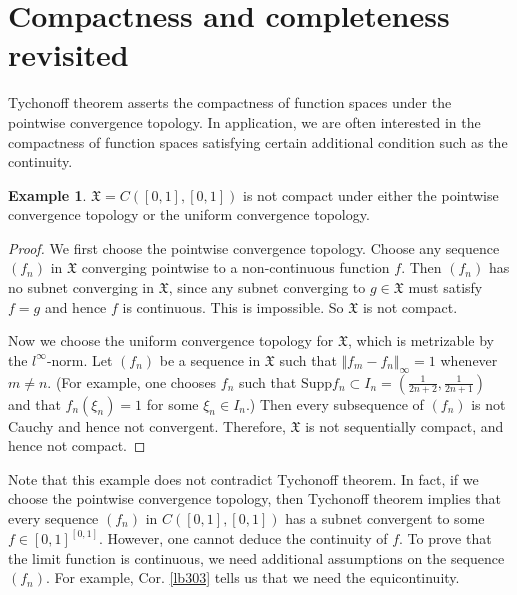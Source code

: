 \documentclass[12pt,b5paper,notitlepage]{article}
\theoremstyle{definition}
\newtheorem{eg}[df]{Example}
\theoremstyle{plain}
\newcommand{\fk}{\mathfrak}
\newcommand{\Supp}{\mathrm{Supp}}
\numberwithin{equation}{section}
\begin{document}
\newpage




\section{Compactness and completeness revisited}





Tychonoff theorem asserts the compactness of function spaces under the pointwise convergence topology. In application, we are often interested in the compactness of function spaces satisfying certain additional condition such as the continuity. 

\begin{eg}\label{lb518}
$\fk X=C([0,1],[0,1])$ is not compact under either the pointwise convergence topology or the uniform convergence topology.
\end{eg}

\begin{proof}
We first choose the pointwise convergence topology. Choose any sequence $(f_n)$ in $\fk X$ converging pointwise to a non-continuous function $f$. Then $(f_n)$ has no subnet converging in $\fk X$, since any subnet converging to $g\in \fk X$ must satisfy $f=g$ and hence $f$ is continuous. This is impossible. So $\fk X$ is not compact.

Now we choose the uniform convergence topology for $\fk X$, which is metrizable by the $l^\infty$-norm. Let $(f_n)$ be a sequence in $\fk X$ such that $\Vert f_m-f_n\Vert_\infty=1$ whenever $m\neq n$. (For example, one chooses $f_n$ such that $\Supp f_n\subset I_n=(\frac 1{2n+2},\frac 1{2n+1})$ and that $f_n(\xi_n)=1$ for some $\xi_n\in I_n$.) Then every subsequence of $(f_n)$ is not Cauchy and hence not convergent. Therefore, $\fk X$ is not sequentially compact, and hence not compact.
\end{proof}



Note that this example does not contradict Tychonoff theorem. In fact, if we choose the pointwise convergence topology,  then Tychonoff theorem implies that every sequence $(f_n)$ in $C([0,1],[0,1])$ has a subnet convergent to some $f\in [0,1]^{[0,1]}$. However, one cannot deduce the continuity of $f$. To prove that the limit function is continuous, we need additional assumptions on the sequence $(f_n)$.  For example, Cor. \ref{lb303} tells us that we need the equicontinuity.
\end{document}
